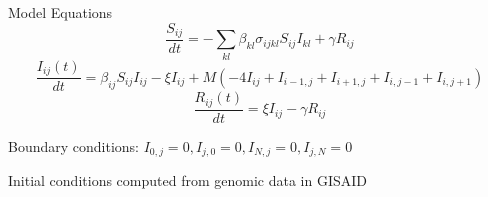\documentclass{beamer}
\begin{document}
\begin{frame}{Model Equations}
    \small
    \begin{equation}
        \frac{S_{ij}}{dt} = -\sum_{kl} \beta_{kl} \sigma_{ijkl} S_{ij} I_{kl} + \gamma R_{ij}  \label{Seqn}
    \end{equation}
    \begin{equation}
        \frac{ I_{ij}(t)}{dt} = \beta_{ij} S_{ij} I_{ij} - \xi I_{ij} + M \left(- 4I_{ij} + I_{i-1,j}  + I_{i+1,j} + I_{i,j-1} + I_{i,j+1} \right) \label{Ieqn}    
    \end{equation}
    \begin{equation}
        \frac{R_{ij}(t)}{dt} = \xi I_{ij} - \gamma R_{ij}  \label{Reqn}
    \end{equation}

    Boundary conditions: $I_{0,j} = 0, I_{j,0} = 0,  I_{N,j} = 0, I_{j,N} = 0$

    Initial conditions computed from genomic data in GISAID 
\end{frame}
\end{document}
